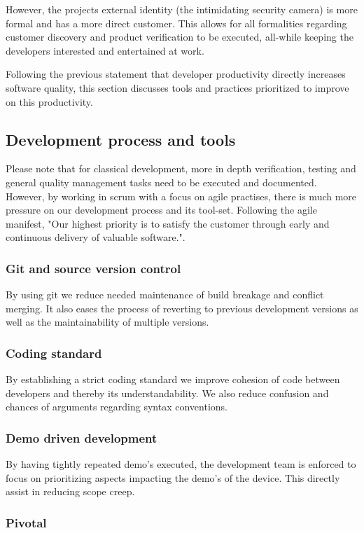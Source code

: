 \documentclass{article}
\begin{document}
However, the projects external identity (the intimidating security camera) is more formal and has a more direct customer.
This allows for all formalities regarding customer discovery and product verification to be executed, all-while keeping the developers interested and entertained at work.

Following the previous statement that developer productivity directly increases software quality, this section discusses tools and practices prioritized to improve on this productivity.

\subsection{Development process and tools}
Please note that for classical development, more in depth verification, testing and general quality management tasks need to be executed and documented.
However, by working in scrum with a focus on agile practises, there is much more pressure on our development process and its tool-set.
Following the agile manifest, "Our highest priority is to satisfy the customer through early and continuous delivery of valuable software.".

\subsubsection{Git and source version control}
By using git we reduce needed maintenance of build breakage and conflict merging.
It also eases the process of reverting to previous development versions as well as the maintainability of multiple versions.

\subsubsection{Coding standard}
By establishing a strict coding standard we improve cohesion of code between developers and thereby its understandability.
We also reduce confusion and chances of arguments regarding syntax conventions.

\subsubsection{Demo driven development}

By having tightly repeated demo's executed, the development team is enforced to focus on prioritizing aspects impacting the demo's of the device.
This directly assist in reducing scope creep.

\subsubsection{Pivotal}
\end{document}
